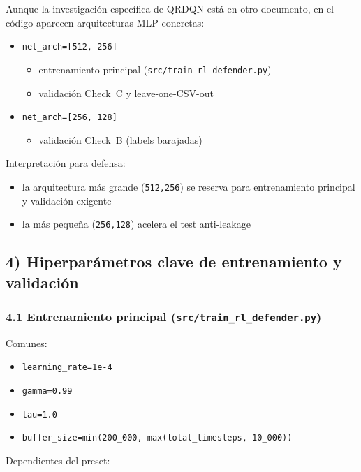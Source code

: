 ﻿\documentclass[12pt,a4paper]{article}
\begin{document}
Aunque la investigación específica de QRDQN está en otro documento, en el código aparecen
arquitecturas MLP concretas:

\begin{itemize}
  \item \texttt{net\_arch=[512,~256]}
    \begin{itemize}
      \item entrenamiento principal (\verb|src/train_rl_defender.py|)
      \item validación Check~C y leave-one-CSV-out
    \end{itemize}
  \item \texttt{net\_arch=[256,~128]}
    \begin{itemize}
      \item validación Check~B (labels barajadas)
    \end{itemize}
\end{itemize}

Interpretación para defensa:

\begin{itemize}
  \item la arquitectura más grande (\texttt{512,256}) se reserva para entrenamiento principal y
        validación exigente
  \item la más pequeña (\texttt{256,128}) acelera el test anti-leakage
\end{itemize}

\subsection{4) Hiperparámetros clave de entrenamiento y validación}

\subsubsection{4.1 Entrenamiento principal (\texttt{src/train\_rl\_defender.py})}

Comunes:

\begin{itemize}
  \item \texttt{learning\_rate=1e-4}
  \item \texttt{gamma=0.99}
  \item \texttt{tau=1.0}
  \item \texttt{buffer\_size=min(200\_000, max(total\_timesteps, 10\_000))}
\end{itemize}

Dependientes del preset:
\end{document}
